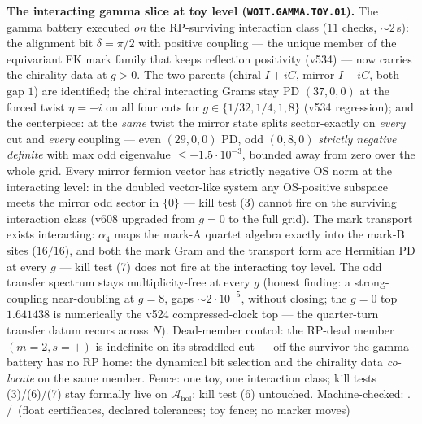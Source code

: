 \documentclass[11pt,a4paper]{article}
\theoremstyle{definition}
\begin{document}
\par\smallskip\noindent\textbf{The interacting gamma slice at toy level
(\texttt{WOIT.GAMMA.TOY.01}).}
The gamma battery executed \emph{on} the RP-surviving interaction
class ($11$ checks, ${\sim}2$\,s): the alignment bit $\delta=\pi/2$
with positive coupling --- the unique member of the equivariant FK
mark family that keeps reflection positivity (v534) --- now carries
the chirality data at $g>0$.  The two parents (chiral $I+iC$, mirror
$I-iC$, both gap $1$) are identified; the chiral interacting Grams
stay PD $(37,0,0)$ at the forced twist $\eta=+i$ on all four cuts
for $g\in\{1/32,1/4,1,8\}$ (v534 regression); and the centerpiece:
at the \emph{same} twist the mirror state splits sector-exactly on
\emph{every} cut and \emph{every} coupling --- even $(29,0,0)$ PD,
odd $(0,8,0)$ \emph{strictly negative definite} with max odd
eigenvalue $\le-1.5\cdot10^{-3}$, bounded away from zero over the
whole grid.  Every mirror fermion vector has strictly negative OS
norm at the interacting level: in the doubled vector-like system any
OS-positive subspace meets the mirror odd sector in $\{0\}$ ---
kill test (3) cannot fire on the surviving interaction class
(v608 upgraded from $g=0$ to the full grid).  The mark transport
exists interacting: $\alpha_4$ maps the mark-A quartet algebra
exactly into the mark-B sites ($16/16$), and both the mark Gram and
the transport form are Hermitian PD at every $g$ --- kill test (7)
does not fire at the interacting toy level.  The odd transfer
spectrum stays multiplicity-free at every $g$ (honest finding: a
strong-coupling near-doubling at $g=8$, gaps ${\sim}2\cdot10^{-5}$,
without closing; the $g=0$ top $1.641438$ is numerically the v524
compressed-clock top --- the quarter-turn transfer datum recurs
across $N$).  Dead-member control: the RP-dead member
$(m{=}2,s{=}+)$ is indefinite on its straddled cut --- off the
survivor the gamma battery has no RP home: the dynamical bit
selection and the chirality data \emph{co-locate} on the same
member.  Fence: one toy, one interaction class; kill tests
(3)/(6)/(7) stay formally live on $\mathcal A_{\mathrm{hol}}$; kill
test (6) untouched.
Machine-checked: .
\mE/\mC\ (float certificates, declared tolerances; toy fence;
no marker moves)
\par\smallskip
\end{document}
